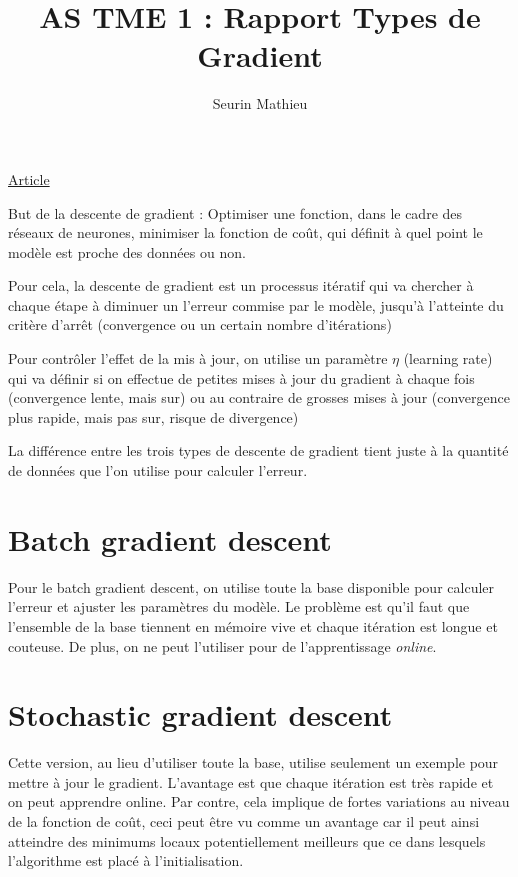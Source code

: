 \documentclass[a4paper]{article}
\title{AS TME 1 : Rapport Types de Gradient}
\author{Seurin Mathieu}
\begin{document}
\maketitle

\href{http://sebastianruder.com/optimizing-gradient-descent/}{Article}


But de la descente de gradient : Optimiser une fonction, dans le cadre des réseaux de neurones, minimiser la fonction de coût, qui définit à quel point le modèle est proche des données ou non.

Pour cela, la descente de gradient est un processus itératif qui va chercher à chaque étape à diminuer un l'erreur commise par le modèle, jusqu'à l'atteinte du critère d'arrêt (convergence ou un certain nombre d'itérations)

Pour contrôler l'effet de la mis à jour, on utilise un paramètre $\eta$ (learning rate) qui va définir si on effectue de petites mises à jour du gradient à chaque fois (convergence lente, mais sur) ou au contraire de grosses mises à jour (convergence plus rapide, mais pas sur, risque de divergence) 

La différence entre les trois types de descente de gradient tient juste à la quantité de données que l'on utilise pour calculer l'erreur. 

\section{Batch gradient descent}

Pour le batch gradient descent, on utilise toute la base disponible pour calculer l'erreur et ajuster les paramètres du modèle.
Le problème est qu'il faut que l'ensemble de la base tiennent en mémoire vive et chaque itération est longue et couteuse. De plus, on ne peut l'utiliser pour de l'apprentissage \textit{online}.

\section{Stochastic gradient descent}

Cette version, au lieu d'utiliser toute la base, utilise seulement un exemple pour mettre à jour le gradient. L'avantage est que chaque itération est très rapide et on peut apprendre online. Par contre, cela implique de fortes variations au niveau de la fonction de coût, ceci peut être vu comme un avantage car il peut ainsi atteindre des minimums locaux potentiellement meilleurs que ce dans lesquels l'algorithme est placé à l'initialisation. 
\end{document}
